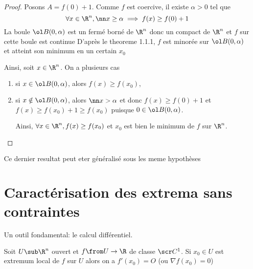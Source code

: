 \begin{proof}
    Posons \(A = f(0) + 1\). Comme \(f\) est coercive, il existe \(\alpha > 0\) tel que
    \begin{equation*}
        \forall x\in\R^n, \nn x\geq \alpha \implies f(x) \geq  f(0) + 1
    \end{equation*}
    La boule \(\ol B(0, \alpha)\) est un fermé borné de \(\R^n\) %
    donc un compact de \(\R^n\) et \(f\) sur cette boule est continue %
    D'après le theoreme 1.1.1, \(f\) est minorée sur \(\ol B(0, \alpha)\) et atteint son minimum en un certain  %
    \(x_0\)

    Ainsi, soit \(x\in\R^n\). On a plusieurs cas
    \begin{enumerate}[label=(\alph*)]
        \item si \(x\in \ol B(0, \alpha)\), alors \(f(x)\geq f(x_0)\),

        \item si \(x\notin \ol B(0, \alpha)\), alors \(\nn x > \alpha\) et 
        donc \(f(x)\geq f(0) + 1\) et \(f(x)\geq f(x_0) + 1 \geq f(x_0)\)
        puisque \(0\in \ol B(0, \alpha)\).

        Ainsi, \(\forall x\in\R^n, f(x)\geq f(x_0)\) et \(x_0\)
        est bien le minimum de \(f\) sur \(\R^n\).
    \end{enumerate}
\end{proof}

\begin{remark}
    Ce dernier resultat peut eter généralisé sous les meme hypothèses

\end{remark}

\section{Caractérisation des extrema sans contraintes}

Un outil fondamental: le calcul différentiel.

\begin{theorem}
    Soit \(U\sub \R^n\) ouvert et \(f\from U\to \R\) de classe \(\scr C^1\).
    Si \(x_0\in U\) est extremum local de \(f\) sur \(U\) alors on a 
    \(f'(x_0) = O\) (ou \(\nabla f(x_0)=0\))
\end{theorem}

